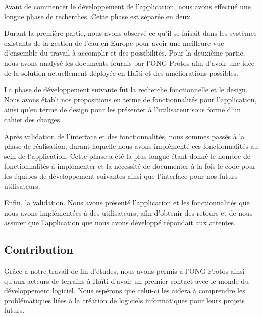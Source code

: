 \documentclass{eplmastersthesis_FR}
\begin{document}
			Avant de commencer le développement de l'application, nous avons effectué une longue phase de recherches. Cette phase est séparée en deux.

			Durant la première partie, nous avons observé ce qu'il se faisait dans les systèmes existants de la gestion de l'eau en Europe pour avoir une meilleure vue d'ensemble du travail à accomplir et des possibilités. Pour la deuxième partie, nous avons analysé les documents fournis par l'ONG Protos afin d'avoir une idée de la solution actuellement déployée en Haïti et des améliorations possibles.

			La phase de développement suivante fut la recherche fonctionnelle et le design. Nous avons établi nos propositions en terme de fonctionnalités pour l'application, ainsi qu'en terme de design pour les présenter à l'utilisateur sous forme d'un cahier des charges.

			Après validation de l'interface et des fonctionnalités, nous sommes passés à la phase de réalisation, durant laquelle nous avons implémenté ces fonctionnalités au sein de l'application. Cette phase a été la plus longue étant donné le nombre de fonctionnalités à implémenter et la nécessité de documenter à la fois le code pour les équipes de développement suivantes ainsi que l'interface pour nos futurs utilisateurs.

			Enfin, la validation. Nous avons présenté l'application et les fonctionnalités que nous avons implémentées à des utilisateurs, afin d'obtenir des retours et de nous assurer que l'application que nous avons développé répondait aux attentes.


		\subsection*{Contribution}

			Grâce à notre travail de fin d'études, nous avons permis à l'ONG Protos ainsi qu'aux acteurs de terrains à Haïti d'avoir un premier contact avec le monde du développement logiciel. Nous espérons que celui-ci les aidera à comprendre les problématiques liées à la création de logiciels informatiques pour leurs projets futurs.
\end{document}
